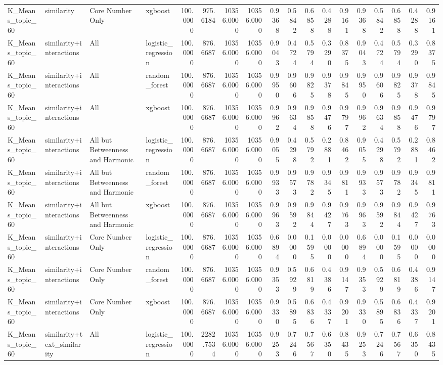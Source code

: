 \begin{tabular}{llllrrrrrrrrrrrrrr}
K_Means_topic_60 & similarity & Core Number Only & xgboost & 100.0000 & 975.6184 & 10356.0000 & 10356.0000 & 0.9368 & 0.5842 & 0.6858 & 0.4288 & 0.9161 & 0.9368 & 0.5842 & 0.6858 & 0.4288 & 0.9161 \\
K_Means_topic_60 & similarity+interactions & All & logistic_regression & 100.0000 & 876.6687 & 10356.0000 & 10356.0000 & 0.9043 & 0.4724 & 0.5794 & 0.3290 & 0.8375 & 0.9043 & 0.4724 & 0.5794 & 0.3290 & 0.8375 \\
K_Means_topic_60 & similarity+interactions & All & random_forest & 100.0000 & 876.6687 & 10356.0000 & 10356.0000 & 0.9950 & 0.9606 & 0.9825 & 0.9378 & 0.9845 & 0.9950 & 0.9606 & 0.9825 & 0.9378 & 0.9845 \\
K_Means_topic_60 & similarity+interactions & All & xgboost & 100.0000 & 876.6687 & 10356.0000 & 10356.0000 & 0.9962 & 0.9634 & 0.9858 & 0.9476 & 0.9797 & 0.9962 & 0.9634 & 0.9858 & 0.9476 & 0.9797 \\
K_Means_topic_60 & similarity+interactions & All but Betweenness and Harmonic & logistic_regression & 100.0000 & 876.6687 & 10356.0000 & 10356.0000 & 0.9055 & 0.4298 & 0.5792 & 0.2881 & 0.8462 & 0.9055 & 0.4298 & 0.5792 & 0.2881 & 0.8462 \\
K_Means_topic_60 & similarity+interactions & All but Betweenness and Harmonic & random_forest & 100.0000 & 876.6687 & 10356.0000 & 10356.0000 & 0.9933 & 0.9573 & 0.9782 & 0.9345 & 0.9811 & 0.9933 & 0.9573 & 0.9782 & 0.9345 & 0.9811 \\
K_Means_topic_60 & similarity+interactions & All but Betweenness and Harmonic & xgboost & 100.0000 & 876.6687 & 10356.0000 & 10356.0000 & 0.9963 & 0.9592 & 0.9844 & 0.9427 & 0.9763 & 0.9963 & 0.9592 & 0.9844 & 0.9427 & 0.9763 \\
K_Means_topic_60 & similarity+interactions & Core Number Only & logistic_regression & 100.0000 & 876.6687 & 10356.0000 & 10356.0000 & 0.6894 & 0.0000 & 0.1595 & 0.0000 & 0.0000 & 0.6894 & 0.0000 & 0.1595 & 0.0000 & 0.0000 \\
K_Means_topic_60 & similarity+interactions & Core Number Only & random_forest & 100.0000 & 876.6687 & 10356.0000 & 10356.0000 & 0.9353 & 0.5929 & 0.6819 & 0.4386 & 0.9147 & 0.9353 & 0.5929 & 0.6819 & 0.4386 & 0.9147 \\
K_Means_topic_60 & similarity+interactions & Core Number Only & xgboost & 100.0000 & 876.6687 & 10356.0000 & 10356.0000 & 0.9330 & 0.5895 & 0.6836 & 0.4337 & 0.9201 & 0.9330 & 0.5895 & 0.6836 & 0.4337 & 0.9201 \\
K_Means_topic_60 & similarity+text_similarity & All & logistic_regression & 100.0000 & 2282.7534 & 10356.0000 & 10356.0000 & 0.9253 & 0.7246 & 0.7567 & 0.6350 & 0.8435 & 0.9253 & 0.7246 & 0.7567 & 0.6350 & 0.8435 \\

\end{tabular}
